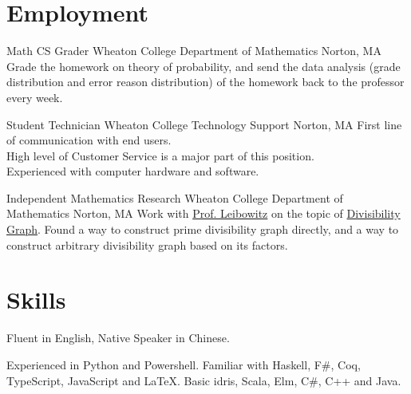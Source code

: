 \documentclass[11pt,a4paper,roman]{moderncv}        %
\begin{document}
\section{Employment}

{Math CS Grader}
{Wheaton College Department of Mathematics}
{Norton, MA}{}
{Grade the homework on theory of probability,
and send the data analysis (grade distribution and error reason distribution)
of the homework back to the professor every week.}

{Student Technician}
{Wheaton College Technology Support}
{Norton, MA}{}
{First line of communication with end users.\\
High level of Customer Service is a major part of this position.\\
Experienced with computer hardware and software.}

{Independent Mathematics Research}
{Wheaton College Department of Mathematics}
{Norton, MA}{}
{Work with \href{https://wheatoncollege.edu/academics/faculty-directory/rochelle-shelly-leibowitz/}{Prof. Leibowitz}
on the topic of \href{https://chantisnake.github.io/2016/05/22/explain-the-divisibility-graph/}{Divisibility Graph}.
Found a way to construct prime divisibility graph directly,
and a way to construct arbitrary divisibility graph based on its factors.}


\section{Skills}

{Fluent in English, Native Speaker in Chinese.}

{Experienced in Python and Powershell.
Familiar with Haskell, F\#, Coq, TypeScript, JavaScript and \LaTeX{}.
Basic idris, Scala, Elm, C\#, C++ and Java.}
\end{document}
